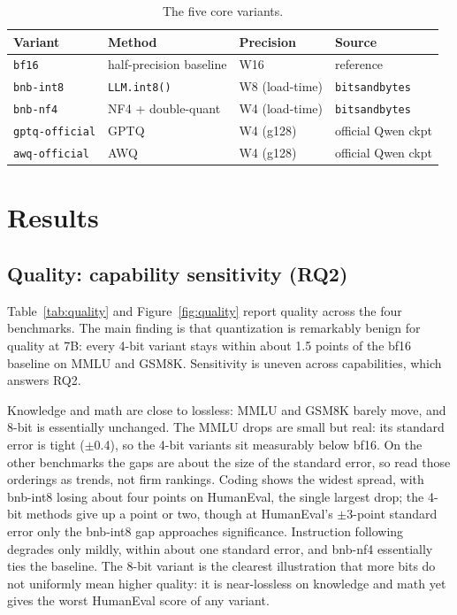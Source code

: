 \documentclass[11pt,a4paper]{article}
\begin{document}
\begin{table}[H]
\centering\small
\begin{tabular}{llll}
\toprule
Variant & Method & Precision & Source \\
\midrule
\texttt{bf16}          & half-precision baseline                 & W16     & reference \\
\texttt{bnb-int8}      & \texttt{LLM.int8()} \citep{llmint8}      & W8 (load-time)  & \texttt{bitsandbytes} \\
\texttt{bnb-nf4}       & NF4 + double-quant                       & W4 (load-time)  & \texttt{bitsandbytes} \\
\texttt{gptq-official} & GPTQ \citep{gptq}                        & W4 (g128)       & official Qwen ckpt \\
\texttt{awq-official}  & AWQ \citep{awq}                          & W4 (g128)       & official Qwen ckpt \\
\bottomrule
\end{tabular}
\caption{The five core variants.}
\label{tab:variants}
\end{table}

\section{Results}

\subsection{Quality: capability sensitivity (RQ2)}

Table~\ref{tab:quality} and Figure~\ref{fig:quality} report quality across the four
benchmarks. The main finding is that quantization is remarkably benign for quality
at 7B: every 4-bit variant stays within about 1.5 points of the bf16 baseline on
MMLU and GSM8K. Sensitivity is uneven across capabilities, which answers RQ2.

Knowledge and math are close to lossless: MMLU and GSM8K barely move, and 8-bit is
essentially unchanged. The MMLU drops are small but real: its standard error is tight ($\pm$0.4), so the
4-bit variants sit measurably below bf16. On the other benchmarks the gaps are about
the size of the standard error, so read those orderings as trends, not firm rankings. Coding shows the widest spread, with
bnb-int8 losing about four points on HumanEval, the single largest drop; the 4-bit
methods give up a point or two, though at HumanEval's $\pm$3-point standard error
only the bnb-int8 gap approaches significance. Instruction following degrades only
mildly, within about one standard error, and bnb-nf4 essentially ties the baseline.
The 8-bit variant is the clearest illustration that more bits do not uniformly mean
higher quality: it is near-lossless on knowledge and math yet gives the worst
HumanEval score of any variant.
\end{document}
